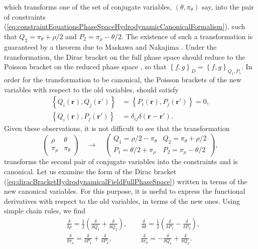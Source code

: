 \documentclass[twocolumn, nofootinbib, nobibnotes, amsmath,amssymb,aps, pra, floatfix]{revtex4-1}
\renewcommand{\v}[1]{\ensuremath{\mathbf{#1}}} %
\begin{document}
which transforms one of the set of conjugate variables, $\left( \theta,\pi_{\theta} \right)$ say, into the pair of constraints (\ref{eq:constraintEquationsPhaseSpaceHydrodynamicCanonicalFormalism}), such that $Q_2=\pi_{\theta}+\rho/2$ and $P_2=\pi_{\rho}-\theta/2$.
The existence of such a transformation is guaranteed by a theorem due to Maskawa and Nakajima \cite{maskawa1976singular}.
Under the transformation, the Dirac bracket on the full phase space should reduce to the Poisson bracket on the reduced phase space \cite{weinberg1995quantum}, so that $\left\{ f,g \right\}_D=\left\{ f,g \right\}_{Q_1,P_1}$.
In order for the transformation to be canonical, the Poisson brackets of the new variables with respect to the old variables, should satisfy
\begin{align}
  \left\{ Q_i\left( \v{r} \right),Q_j\left( \v{r}' \right) \right\}&=\left\{ P_i\left( \v{r} \right),P_j\left( \v{r}' \right) \right\}=0, \nonumber \\
  \left\{ Q_i\left( \v{r} \right),P_j\left( \v{r}' \right)\right\}&=\delta_{ij}\delta\left( \v{r}-\v{r}' \right).
  \label{eq:canonicalTransformationFieldConditions}
\end{align}
Given these observations, it is not difficult to see that the transformation
\begin{equation}
  \begin{pmatrix}
   \rho&\theta\\ 
   \pi_{\rho}&\pi_{\theta}
  \end{pmatrix}
  \quad\rightarrow\quad
  \begin{pmatrix}
    Q_1=\rho/2-\pi_{\theta}& Q_2=\pi_{\theta}+\rho/2 \\
    P_1=\theta/2+\pi_{\rho}& P_2=\pi_{\rho}-\theta/2
  \end{pmatrix},
  \label{eq:canonicalTransformationHydrodynamicalFieldReduction}
\end{equation}
transforms the second pair of conjugate variables into the constraints and is canonical.
Let us examine the form of the Dirac bracket (\ref{eq:diracBracketHydrodynamicalFieldFullPhaseSpace}) written in terms of the new canonical variables.
For this purpose, it is useful to express the functional derivatives with respect to the old variables, in terms of the new ones.
Using simple chain rules, we find
\begin{align}
    &\frac{\delta}{\delta\rho}=\frac{1}{2}\left( \frac{\delta}{\delta Q_1}+\frac{\delta}{\delta Q_2} \right),\quad\quad\frac{\delta}{\delta\theta}=\frac{1}{2}\left( \frac{\delta}{\delta P_1}-\frac{\delta}{\delta P_2} \right), \nonumber \\
    &\frac{\delta}{\delta\pi_{\rho}}=\frac{\delta}{\delta P_1}+\frac{\delta}{\delta P_2}, \quad\quad\quad\quad\frac{\delta}{\delta\pi_{\theta}}=-\frac{\delta}{\delta Q_1}+\frac{\delta}{\delta Q_2}.\label{eq:functionalDerivativeTransformationsCanonicalTransformationHydrodynamicalPhaseSpaceReduction}
\end{align}
\end{document}
